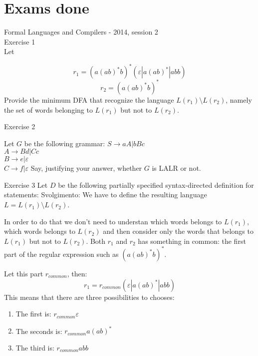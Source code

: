 \chapter{Exams done}

Formal Languages and Compilers - 2014, session 2\\
Exercise 1\\
Let

\begin{equation}
r_1 = (a(ab)^*b)^*(\varepsilon|a(ab)^*|abb)
\end{equation}
\begin{equation}
r_2 = (a(ab)^*b)^*
\end{equation}
\newline
Provide the minimum DFA that recognize the language $L(r_1) \setminus L(r_2)$, namely the set of words belonging to $L(r_1)$ but not to $L(r_2)$.

Exercise 2

Let $G$ be the following grammar:
$ S \rightarrow aA | bBc $ \\
$ A \rightarrow Bd | Cc $ \\
$ B \rightarrow e | \varepsilon $ \\
$ C \rightarrow f | \varepsilon $
\newline
Say, justifying your answer, whether $G$ is LALR or not.

Exercise 3
\newline
Let $D$ be the following partially specified syntax-directed definition for statements:
\newline
Svolgimento:
\newline
We have to define the resulting language $L = L(r_1) \setminus L(r_2)$.

In order to do that we don't need to understan which words belongs to $L(r_1)$, which words belongs to $L(r_2)$ and then consider only the words that belongs to $L(r_1)$ but not to $L(r_2)$.
Both $r_1$ and $r_2$ has something in common: the first part of the regular expression such as $(a(ab)^*b)^*$.

Let this part $r_{common}$, then:
\begin{equation}
r_1 = r_{common}(\varepsilon|a(ab)^*|abb)
\end{equation}
This means that there are three possibilities to chooses:
\begin{enumerate}
\item The first is: $r_{common}\varepsilon$
\item The seconds is: $r_{common}a(ab)^*$
\item The third is: $r_{common}abb$
\end{enumerate}

